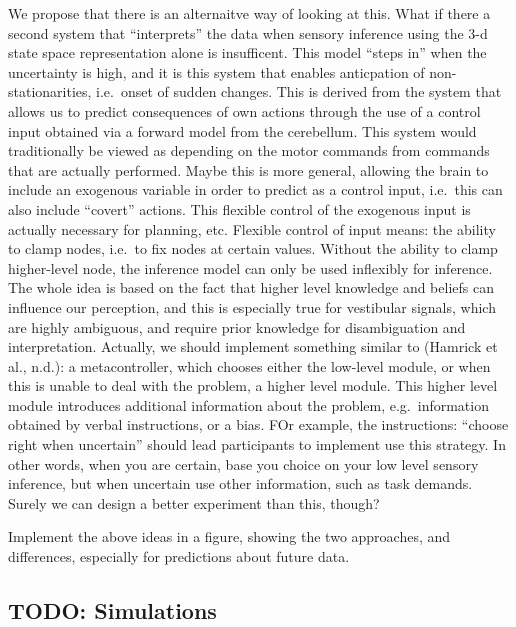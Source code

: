 \documentclass[english,floatsintext,man]{apa6}
\theoremstyle{definition}
\theoremstyle{definition}
\theoremstyle{remark}
\begin{document}
We propose that there is an alternaitve way of looking at this. What if
there a second system that \enquote{interprets} the data when sensory
inference using the 3-d state space representation alone is insufficent.
This model \enquote{steps in} when the uncertainty is high, and it is
this system that enables anticpation of non-stationarities, i.e.~onset
of sudden changes. This is derived from the system that allows us to
predict consequences of own actions through the use of a control input
obtained via a forward model from the cerebellum. This system would
traditionally be viewed as depending on the motor commands from commands
that are actually performed. Maybe this is more general, allowing the
brain to include an exogenous variable in order to predict as a control
input, i.e.~this can also include \enquote{covert} actions. This
flexible control of the exogenous input is actually necessary for
planning, etc. Flexible control of input means: the ability to clamp
nodes, i.e.~to fix nodes at certain values. Without the ability to clamp
higher-level node, the inference model can only be used inflexibly for
inference. The whole idea is based on the fact that higher level
knowledge and beliefs can influence our perception, and this is
especially true for vestibular signals, which are highly ambiguous, and
require prior knowledge for disambiguation and interpretation. Actually,
we should implement something similar to (Hamrick et al., n.d.): a
metacontroller, which chooses either the low-level module, or when this
is unable to deal with the problem, a higher level module. This higher
level module introduces additional information about the problem,
e.g.~information obtained by verbal instructions, or a bias. FOr
example, the instructions: \enquote{choose right when uncertain} should
lead participants to implement use this strategy. In other words, when
you are certain, base you choice on your low level sensory inference,
but when uncertain use other information, such as task demands. Surely
we can design a better experiment than this, though?

Implement the above ideas in a figure, showing the two approaches, and
differences, especially for predictions about future data.

\subsection{TODO: Simulations}\label{todo-simulations}
\end{document}
